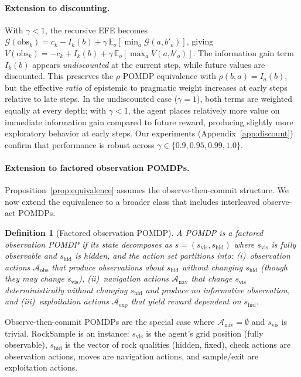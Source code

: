 \documentclass{article}
\newtheorem{definition}{Definition}[section]
\begin{document}
\paragraph{Extension to discounting.} With $\gamma < 1$, the recursive EFE becomes $\mathcal{G}(\text{obs}_k) = c_k - I_k(b) + \gamma\, \mathbb{E}_o[\min_a \mathcal{G}(a, b'_o)]$, giving $V(\text{obs}_k) = -c_k + I_k(b) + \gamma\, \mathbb{E}_o[\max_a V(a, b'_o)]$. The information gain term $I_k(b)$ appears \emph{undiscounted} at the current step, while future values are discounted. This preserves the $\rho$-POMDP equivalence with $\rho(b,a) = I_a(b)$, but the effective \emph{ratio} of epistemic to pragmatic weight increases at early steps relative to late steps. In the undiscounted case ($\gamma{=}1$), both terms are weighted equally at every depth; with $\gamma < 1$, the agent places relatively more value on immediate information gain compared to future reward, producing slightly more exploratory behavior at early steps. Our experiments (Appendix~\ref{app:discount}) confirm that performance is robust across $\gamma \in \{0.9, 0.95, 0.99, 1.0\}$.

\paragraph{Extension to factored observation POMDPs.}
\label{par:frontier}
Proposition~\ref{prop:equivalence} assumes the observe-then-commit structure. We now extend the equivalence to a broader class that includes interleaved observe-act POMDPs.

\begin{definition}[Factored observation POMDP]
\label{def:factored}
A POMDP is a \emph{factored observation POMDP} if its state decomposes as $s = (s_{\mathrm{vis}}, s_{\mathrm{hid}})$ where $s_{\mathrm{vis}}$ is fully observable and $s_{\mathrm{hid}}$ is hidden, and the action set partitions into: (i)~\emph{observation actions} $\mathcal{A}_{\mathrm{obs}}$ that produce observations about $s_{\mathrm{hid}}$ without changing $s_{\mathrm{hid}}$ (though they may change $s_{\mathrm{vis}}$), (ii)~\emph{navigation actions} $\mathcal{A}_{\mathrm{nav}}$ that change $s_{\mathrm{vis}}$ deterministically without changing $s_{\mathrm{hid}}$ and produce no informative observation, and (iii)~\emph{exploitation actions} $\mathcal{A}_{\mathrm{exp}}$ that yield reward dependent on $s_{\mathrm{hid}}$.
\end{definition}

Observe-then-commit POMDPs are the special case where $\mathcal{A}_{\mathrm{nav}} = \emptyset$ and $s_{\mathrm{vis}}$ is trivial. RockSample \citep{smith2004} is an instance: $s_{\mathrm{vis}}$ is the agent's grid position (fully observable), $s_{\mathrm{hid}}$ is the vector of rock qualities (hidden, fixed), check actions are observation actions, moves are navigation actions, and sample/exit are exploitation actions.
\end{document}
